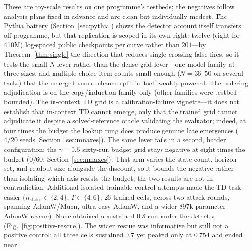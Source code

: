 \documentclass[11pt]{article}
\theoremstyle{plain}
\theoremstyle{definition}
\begin{document}
These are toy-scale results on one programme's testbeds; the negatives follow analysis
plans fixed in advance and are clean but individually modest. The Pythia battery
(Section~\ref{sec:pythia}) shows the detector account itself transfers off-programme,
but that replication is scoped in its own right: twelve (eight for 410M) log-spaced
public checkpoints per curve rather than $201$---by Theorem~\ref{thm:single} the
direction that reduces single-crossing false fires, so it tests the small-$N$ lever
rather than the dense-grid lever---one model family at three sizes, and
multiple-choice item counts small enough ($N{=}36$--$50$ on several tasks) that the
emerged-versus-chance split is itself weakly powered. The ordering adjudication is on the copy/induction family
only (other families were testbed-bounded). The in-context TD grid is a calibration-failure vignette---it does
not establish that in-context TD cannot emerge, only that the trained grid cannot
adjudicate it despite a solved-reference oracle validating the evaluator; indeed, at
four times the budget the lookup rung does produce genuine late emergences ($4/20$
seeds; Section~\ref{sec:mnaxes}). The same lever fails in a second, harder configuration:
the $\gamma=0.5$ sixty-run budget grid stays negative at eight times the budget ($0/60$;
Section~\ref{sec:mnaxes}). That arm varies the state count, horizon set, and readout size
alongside the discount, so it bounds the negative rather than isolating which axis
resists the budget; the two results are not in contradiction.
Additional isolated trainable-control attempts made the TD task easier
($n_{\mathrm{states}}\in\{2,4\}$, $T\in\{4,6\}$; 26 trained cells, across two attack rounds, spanning AdamW/Muon,
ultra-easy AdamW, and a wider 897k-parameter AdamW rescue). None obtained a sustained
$0.8$ run under the detector (Fig.~\ref{fig:positive-rescue}). The wider rescue was informative but still not a positive
control: all three cells sustained $0.7$ yet peaked only at $0.754$ and ended near
\end{document}
